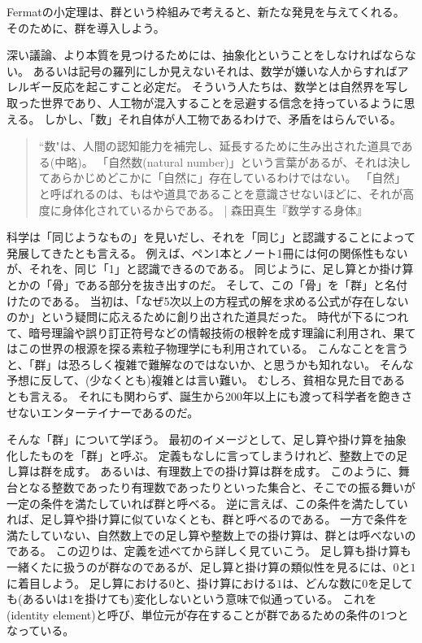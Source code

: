 Fermatの小定理は、群という枠組みで考えると、新たな発見を与えてくれる。
そのために、群を導入しよう。

深い議論、より本質を見つけるためには、抽象化ということをしなければならない。
あるいは記号の羅列にしか見えないそれは、数学が嫌いな人からすればアレルギー反応を起こすこと必定だ。
そういう人たちは、数学とは自然界を写し取った世界であり、人工物が混入することを忌避する信念を持っているように思える。
しかし、「数」それ自体が人工物であるわけで、矛盾をはらんでいる。

\begin{quote}
``数"は、人間の認知能力を補完し、延長するために生み出された道具である(中略)。
「自然数(natural number)」という言葉があるが、それは決してあらかじめどこかに「自然に」存在しているわけではない。
「自然」と呼ばれるのは、もはや道具であることを意識させないほどに、それが高度に身体化されているからである。 | 森田真生『数学する身体』\cite{math_body}
\end{quote}

科学は「同じようなもの」を見いだし、それを「同じ」と認識することによって発展してきたとも言える。
例えば、ペン1本とノート1冊には何の関係性もないが、それを、同じ「1」と認識できるのである。
同じように、足し算とか掛け算とかの「骨」である部分を抜き出すのだ。
そして、この「骨」を「群」と名付けたのである。
当初は、「なぜ5次以上の方程式の解を求める公式が存在しないのか」という疑問に応えるために創り出された道具だった。
時代が下るにつれて、暗号理論や誤り訂正符号などの情報技術の根幹を成す理論に利用され、果てはこの世界の根源を探る素粒子物理学にも利用されている。
こんなことを言うと、「群」は恐ろしく複雑で難解なのではないか、と思うかも知れない。
そんな予想に反して、(少なくとも)複雑とは言い難い。
むしろ、貧相な見た目であるとも言える。
それにも関わらず、誕生から200年以上にも渡って科学者を飽きさせないエンターテイナーであるのだ。

そんな「群」について学ぼう。
最初のイメージとして、足し算や掛け算を抽象化したものを「群」と呼ぶ。
定義もなしに言ってしまうけれど、整数上での足し算は群を成す。
あるいは、有理数上での掛け算は群を成す。
このように、舞台となる整数であったり有理数であったりといった集合と、そこでの振る舞いが一定の条件を満たしていれば群と呼べる。
逆に言えば、この条件を満たしていれば、足し算や掛け算に似ていなくとも、群と呼べるのである。
一方で条件を満たしていない、自然数上での足し算や整数上での掛け算は、群とは呼べないのである。
この辺りは、定義を述べてから詳しく見ていこう。
足し算も掛け算も一緒くたに扱うのが群なのであるが、足し算と掛け算の類似性を見るには、$0$と$1$に着目しよう。
足し算における$0$と、掛け算における$1$は、どんな数に$0$を足しても(あるいは$1$を掛けても)変化しないという意味で似通っている。
これを(identity element)と呼び、単位元が存在することが群であるための条件の1つとなっている。

